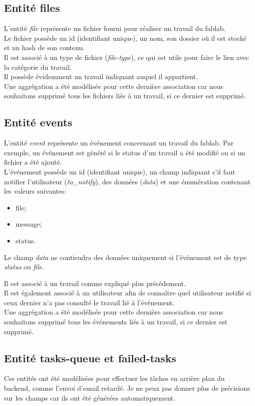 \documentclass[
    iai, %
    il, %
]{heig-tb}
\begin{document}
\subsection{Entité files}
L'entité \emph{file} représente un fichier fourni pour réaliser un travail du \Gls{fablab}.\\
Le fichier possède un id (identifiant unique), un nom, son dossier où il est stocké et un hash de son contenu.\\
Il est associé à un type de fichier (\emph{file-type}), ce qui est utile pour faire le lien avec la catégorie du travail.\\
Il possède évidemment un travail indiquant auquel il appartient.\\
Une aggrégation a été modélisée pour cette dernière association car nous souhaitons supprimé tous les fichiers liés à un travail, si ce dernier est supprimé.

\subsection{Entité events}
L'entité \emph{event} représente un événement concernant un travail du \Gls{fablab}. Par exemple, un événement est généré si le status d'un travail a été modifié ou si un fichier a été ajouté. \\
L'événement possède un id (identifiant unique), un champ indiquant s'il faut notifier l'utilisateur (\emph{to_notify}), des données (\emph{data}) et une énumération contenant les valeurs suivantes:

\begin{itemize}
    \item file;
    \item message;
    \item status.
\end{itemize}

Le champ \emph{data} ne contiendra des données uniquement si l'événement est de type \emph{status} ou \emph{file}.

Il est associé à un travail comme expliqué plus précédement.\\
Il est également associé à un utilisateur afin de connaître quel utilisateur notifié si ceux dernier n'a pas consulté le travail lié à l'événement.\\
Une aggrégation a été modélisée pour cette dernière association car nous souhaitons supprimé tous les événements liés à un travail, si ce dernier est supprimé.

\subsection{Entité tasks-queue et failed-tasks}
Ces entités ont été modélisées pour effectuer les tâches en arrière plan du \Gls{backend}, comme l'envoi d'email retardé. Je ne peux pas donner plus de précisions sur les champs car ils ont été générées automatiquement.
\end{document}
